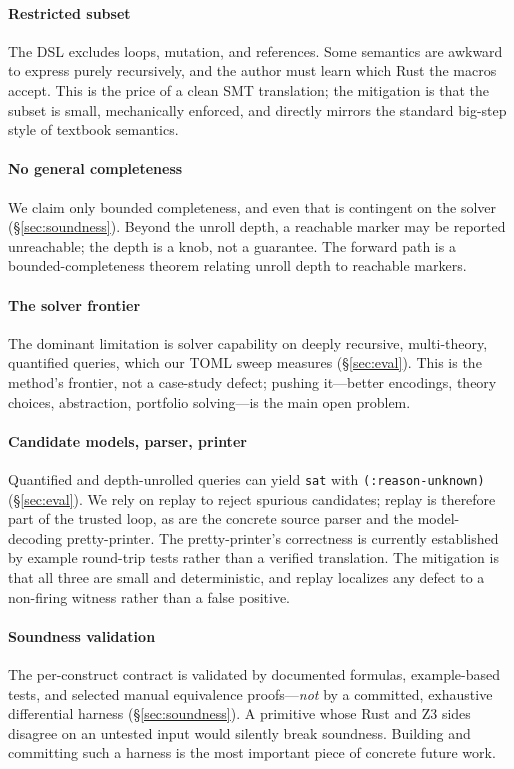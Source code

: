 \documentclass[sigplan,review,anonymous]{acmart}
\theoremstyle{definition}
\theoremstyle{remark}
\newcommand{\toml}{TOML}
\newcommand{\code}[1]{\texttt{#1}}
\begin{document}
\paragraph{Restricted subset}
The DSL excludes loops, mutation, and references. Some semantics are awkward to
express purely recursively, and the author must learn which Rust the macros
accept. This is the price of a clean SMT translation; the mitigation is that the
subset is small, mechanically enforced, and directly mirrors the standard
big-step style of textbook semantics.

\paragraph{No general completeness}
We claim only bounded completeness, and even that is contingent on the solver
(\S\ref{sec:soundness}). Beyond the unroll depth, a reachable marker may be
reported unreachable; the depth is a knob, not a guarantee. The forward path is a
bounded-completeness theorem relating unroll depth to reachable markers.

\paragraph{The solver frontier}
The dominant limitation is solver capability on deeply recursive, multi-theory,
quantified queries, which our \toml{} sweep measures (\S\ref{sec:eval}). This is
the method's frontier, not a case-study defect; pushing it---better encodings,
theory choices, abstraction, portfolio solving---is the main open problem.

\paragraph{Candidate models, parser, printer}
Quantified and depth-unrolled queries can yield \code{sat} with
\code{(:reason-unknown)} (\S\ref{sec:eval}). We rely on replay to reject spurious
candidates; replay is therefore part of the trusted loop, as are the concrete
source parser and the model-decoding pretty-printer. The pretty-printer's
correctness is currently established by example round-trip tests rather than a
verified translation. The mitigation is that all three are small and
deterministic, and replay localizes any defect to a non-firing witness rather than
a false positive.

\paragraph{Soundness validation}
The per-construct contract is validated by documented formulas, example-based
tests, and selected manual equivalence proofs---\emph{not} by a committed,
exhaustive differential harness (\S\ref{sec:soundness}). A primitive whose Rust
and Z3 sides disagree on an untested input would silently break soundness.
Building and committing such a harness is the most important piece of concrete
future work.
\end{document}
